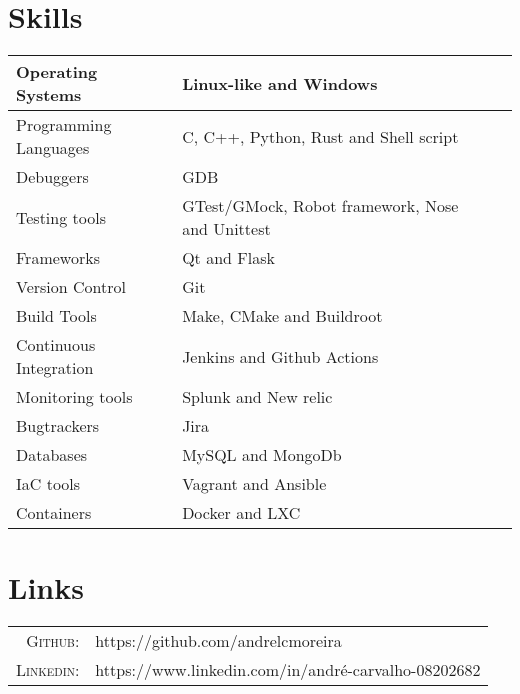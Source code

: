 \documentclass[a4paper,10pt]{article}
\begin{document}
\section{Skills}
\begin{center}
  \begin{tabular}{| l | l | l | l |}
    \hline
    Operating Systems & Linux-like and Windows\\ \hline
    Programming Languages & C, C++, Python, Rust and Shell script\\ \hline
    Debuggers & GDB \\ \hline
    Testing tools & GTest/GMock, Robot framework, Nose and Unittest\\ \hline
    Frameworks & Qt and Flask\\ \hline
    Version Control & Git\\ \hline
    Build Tools & Make, CMake and Buildroot\\ \hline
    Continuous Integration & Jenkins and Github Actions\\ \hline
    Monitoring tools & Splunk and New relic\\ \hline
    Bugtrackers & Jira\\ \hline
    Databases & MySQL and MongoDb\\ \hline
    IaC tools & Vagrant and Ansible\\ \hline
    Containers & Docker and LXC\\ \hline
  \end{tabular}
\end{center}

\section{Links}
\begin{tabular}{rl}
  \textsc{Github:}& https://github.com/andrelcmoreira\\
  \textsc{Linkedin:}&https://www.linkedin.com/in/andré-carvalho-08202682 \\
\end{tabular}
\end{document}

